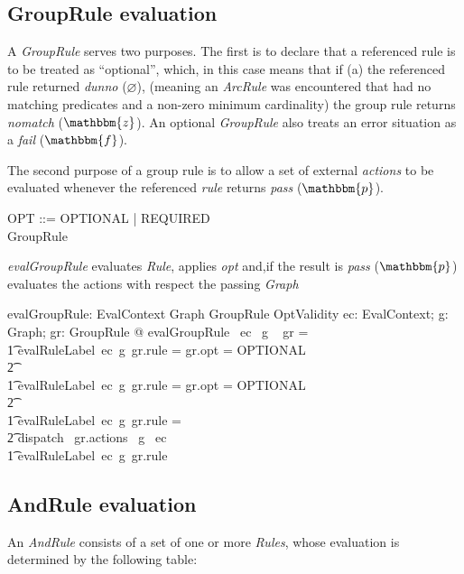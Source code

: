 \documentclass[fuzz]{llncs}
\def\pass{{\mathbbm{p}}}
\def\fail{{\mathbbm{f}}}
\def\dunno{\varnothing}
\def\error{\varepsilon}
\def\nomatch{\mathbbm{z}}
\def\zc{\textit}
\begin{document}
\subsection{GroupRule evaluation}
A \zc{GroupRule} serves two purposes.  The first is to declare that a referenced rule is to be
treated as ``optional'', which, in this case means that if (a) the referenced rule returned
\zc{dunno} ($\dunno$), (meaning an \zc{ArcRule} was encountered that had no matching
predicates and a non-zero minimum cardinality) the group rule returns \zc{nomatch} 
($\nomatch$).  An optional \zc{GroupRule} also treats an error situation as a \zc{fail} 
($\fail$).

The second purpose of a group rule is to allow a set of external \zc{actions} to be evaluated
whenever the referenced \zc{rule} returns \zc{pass} ($\pass$). 


\begin{zed}
OPT ::= OPTIONAL | REQUIRED \\
GroupRule  \\
\end{zed}
\zc{evalGroupRule} evaluates \zc{Rule}, applies \zc{opt} and,if the result is \zc{pass} ($\pass$) evaluates the actions with respect the passing \zc{Graph} 
\begin{gendef}
   evalGroupRule: EvalContext \fun Graph \fun GroupRule \fun OptValidity
\where
   \forall ec: EvalContext; g: Graph; gr: GroupRule @ evalGroupRule~ ec~ g ~ gr = \\
\t1 \IF evalRuleLabel~ec~g~gr.rule = \dunno \land gr.opt = OPTIONAL \\
\t2 \THEN \nomatch \\
\t1 \ELSE \IF evalRuleLabel~ec~g~gr.rule = \error \land gr.opt = OPTIONAL \\
\t2 \THEN \fail \\
\t1 \ELSE \IF evalRuleLabel~ec~g~gr.rule = \pass \\
\t2 \THEN dispatch~ gr.actions~ g~ ec \\
\t1 \ELSE evalRuleLabel~ec~g~gr.rule
\end{gendef}

\subsection{AndRule evaluation}
An \zc{AndRule} consists of a set of one or more \zc{Rules}, whose evaluation is determined
by the following table: \\
\end{document}
